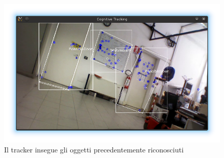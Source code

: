 \begin{figure}[ht]
  \includegraphics[width=\textwidth]{immagini/risultati/tracker2}
  \caption{Il tracker insegue gli oggetti precedentemente riconosciuti}
  \label{fig:tracker2}
\end{figure}